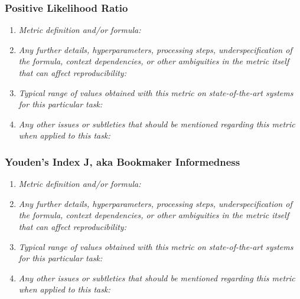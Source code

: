 \documentclass[a4paper,11pt]{article}
\begin{document}
        \subsubsection{Positive Likelihood Ratio}
            \begin{enumerate}[label=\alph*.]
                \item \textit{Metric definition and/or formula:}
                \bigskip
                \item \textit{Any further details, hyperparameters, processing steps, underspecification of the formula, context dependencies, or other ambiguities in the metric itself that can affect reproducibility:}
                \bigskip
                \item \textit{Typical range of values obtained with this metric on state-of-the-art systems for this particular task:}
                \bigskip
                \item \textit{Any other issues or subtleties that should be mentioned regarding this metric when applied to this task:}
                \bigskip
            \end{enumerate}
        \subsubsection{Youden's Index J, aka Bookmaker Informedness}
            \begin{enumerate}[label=\alph*.]
                \item \textit{Metric definition and/or formula:}
                \bigskip
                \item \textit{Any further details, hyperparameters, processing steps, underspecification of the formula, context dependencies, or other ambiguities in the metric itself that can affect reproducibility:}
                \bigskip
                \item \textit{Typical range of values obtained with this metric on state-of-the-art systems for this particular task:}
                \bigskip
                \item \textit{Any other issues or subtleties that should be mentioned regarding this metric when applied to this task:}
                \bigskip
            \end{enumerate}
\end{document}
